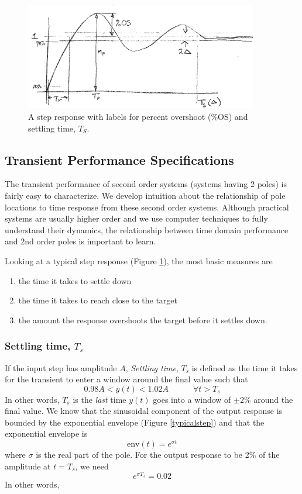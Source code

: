 \begin{figure}\centering
\includegraphics[width=4.0in]{figs11/00472a.png}
\caption{A step response with labels for percent overshoot (\%OS) and settling time, $T_S$.}\label{stepresponse}
\end{figure}


\subsection{Transient Performance Specifications}

The transient performance of second order systems (systems having 2 poles) is fairly easy to characterize.  We develop intuition about the relationship of pole locations to time response from these second order systems.  Although practical systems are usually higher order and we use computer techniques to fully understand their dynamics, the relationship between time domain performance and 2nd order poles is important to learn.

Looking at a typical step response (Figure \ref{stepresponse}), the most basic measures are 
\begin{enumerate}
    \item the time it takes to settle down
    \item the time it takes to reach close to the target
    \item the amount the response overshoots the target before it settles down.
\end{enumerate}

\subsubsection{Settling time, $T_s$}
If the input step has amplitude $A$,
{\it Settling time}, $T_s$ is defined as the time it takes for the transient to enter a window around the final value such that
\[
0.98A < y(t) < 1.02A   \qquad\quad \forall t > T_s
\]
In other words, $T_s$ is the {\it last} time $y(t)$ goes into a window of $\pm2\%$ around the final value.
We know that the sinusoidal component of the output response is bounded by the exponential envelope (Figure \ref{typicalstep}) and that the exponential envelope is
\[
\mathrm{env}(t) = e^{\sigma t}
\]
where $\sigma$ is the real part of the pole.  For the output response to be 2\% of the amplitude at $t=T_s$, we need
\[
e^{\sigma T_s} = 0.02
\]
In other words,

